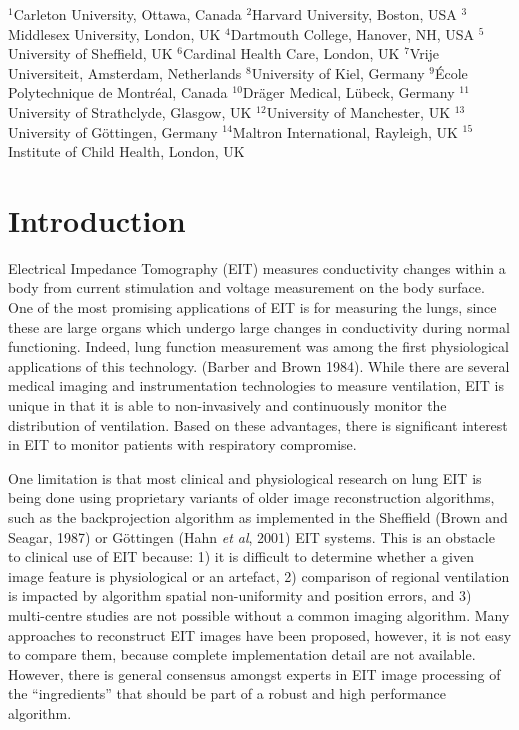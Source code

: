 \documentclass[letterpaper,twocolumn,10pt]{article}
\newcommand{\etal}{{\em et al}}
\begin{document}

{\small
 $^{1}$Carleton University, Ottawa, Canada
 $^{2}$Harvard University, Boston, USA
 $^{3}$Middlesex University, London, UK
 $^{4}$Dartmouth College, Hanover, NH, USA
 $^{5}$University of Sheffield, UK
 $^{6}$Cardinal Health Care, London, UK
 $^{7}$Vrije Universiteit, Amsterdam, Netherlands
 $^{8}$University of Kiel, Germany
 $^{9}$\'Ecole Polytechnique de Montr\'eal, Canada
$^{10}$Dr\"ager Medical, L\"ubeck, Germany
$^{11}$University of Strathclyde, Glasgow, UK
$^{12}$University of Manchester, UK
$^{13}$University of G\"ottingen, Germany
$^{14}$Maltron International, Rayleigh, UK
$^{15}$Institute of Child Health, London, UK
}
\renewcommand{\baselinestretch}{1.0} \normalfont


\section{Introduction}
Electrical Impedance Tomography (EIT) measures conductivity
changes within a body from current stimulation and voltage
measurement on the body surface. One of the most promising
applications of EIT is for measuring the lungs, since these
are large organs which undergo large changes in conductivity
during normal functioning. Indeed, lung function measurement
was among the first physiological applications of this technology.
(Barber and Brown 1984).
While there are several medical imaging and instrumentation
technologies to measure ventilation, EIT is unique in that it
is able to non-invasively and continuously monitor the distribution of 
ventilation. Based on these advantages, there is significant
interest in EIT to 
monitor patients with respiratory compromise.

One limitation is that most clinical and physiological research
on lung EIT is being done using proprietary variants of
older image reconstruction algorithms, such as the backprojection
algorithm as implemented
in the Sheffield (Brown and Seagar, 1987)
or G\"ottingen (Hahn \etal, 2001) EIT systems.
This is an obstacle to clinical use of EIT because:
1) it is difficult to determine whether a given image feature is 
physiological or an artefact,
2) comparison of regional ventilation is impacted by
algorithm spatial non-uniformity and position errors,
and 
3) multi-centre studies are not possible without a 
common imaging algorithm.
Many approaches to reconstruct EIT images have been proposed,
however, it is not easy to compare them, because 
complete implementation detail are not available.
However, there is general consensus amongst experts
in EIT image processing of the ``ingredients'' that should
be part of a robust and high performance algorithm.
\end{document}
